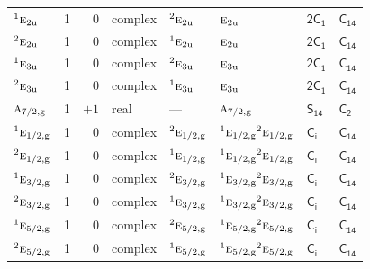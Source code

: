 \documentclass[10pt,a4paper]{article}
\makeatletter
\def\grouprule#1#2{\noalign{\marks\LTgroupmarks{\the\belowrulesep}\nobreak\vskip#1%
  \vskip\aboverulesep}\multispan\LT@cols\unskip{\leaders\hrule\@height#2\hfill\kern\z@}\cr
  \noalign{\penalty\LTrulebreak\vskip\belowrulesep\global\@lastruleclass\z@}}
\numberwithin{equation}{section}
\newcommand{\grp}[1]{\mathsf{#1}}
\newcommand{\irr}[1]{\text{\normalfont\scshape #1}}
\newcommand{\conjpair}[1]{{}^{#1}}
\newcommand{\ptag}[1]{\mathrm{#1}}
\makeatother
\begin{document}
{\begin{longtable}{@{}lrrlllll@{}}
$\conjpair{1}\irr{e}_{2\ptag{u}}$ & 1 & $0$ & complex & $\conjpair{2}\irr{e}_{2\ptag{u}}$ & $\irr{e}_{2\ptag{u}}$ & \href{2C1.pdf}{$\grp{2C_{1}}$} & $\grp{C_{14}}$\\
$\conjpair{2}\irr{e}_{2\ptag{u}}$ & 1 & $0$ & complex & $\conjpair{1}\irr{e}_{2\ptag{u}}$ & $\irr{e}_{2\ptag{u}}$ & \href{2C1.pdf}{$\grp{2C_{1}}$} & $\grp{C_{14}}$\\
$\conjpair{1}\irr{e}_{3\ptag{u}}$ & 1 & $0$ & complex & $\conjpair{2}\irr{e}_{3\ptag{u}}$ & $\irr{e}_{3\ptag{u}}$ & \href{2C1.pdf}{$\grp{2C_{1}}$} & $\grp{C_{14}}$\\
$\conjpair{2}\irr{e}_{3\ptag{u}}$ & 1 & $0$ & complex & $\conjpair{1}\irr{e}_{3\ptag{u}}$ & $\irr{e}_{3\ptag{u}}$ & \href{2C1.pdf}{$\grp{2C_{1}}$} & $\grp{C_{14}}$\\
\grouprule{0pt}{\lightrulewidth}
$\irr{a}_{7/2,\ptag{g}}$ & 1 & $+1$ & real & --- & $\irr{a}_{7/2,\ptag{g}}$ & \href{S14.pdf}{$\grp{S_{14}}$} & \href{../../../rotation/data/pdf/C2.pdf}{$\grp{C_{2}}$}\\
$\conjpair{1}\irr{e}_{1/2,\ptag{g}}$ & 1 & $0$ & complex & $\conjpair{2}\irr{e}_{1/2,\ptag{g}}$ & $\conjpair{1}\irr{e}_{1/2,\ptag{g}}\conjpair{2}\irr{e}_{1/2,\ptag{g}}$ & \href{S2.pdf}{$\grp{C_{i}}$} & $\grp{C_{14}}$\\
$\conjpair{2}\irr{e}_{1/2,\ptag{g}}$ & 1 & $0$ & complex & $\conjpair{1}\irr{e}_{1/2,\ptag{g}}$ & $\conjpair{1}\irr{e}_{1/2,\ptag{g}}\conjpair{2}\irr{e}_{1/2,\ptag{g}}$ & \href{S2.pdf}{$\grp{C_{i}}$} & $\grp{C_{14}}$\\
$\conjpair{1}\irr{e}_{3/2,\ptag{g}}$ & 1 & $0$ & complex & $\conjpair{2}\irr{e}_{3/2,\ptag{g}}$ & $\conjpair{1}\irr{e}_{3/2,\ptag{g}}\conjpair{2}\irr{e}_{3/2,\ptag{g}}$ & \href{S2.pdf}{$\grp{C_{i}}$} & $\grp{C_{14}}$\\
$\conjpair{2}\irr{e}_{3/2,\ptag{g}}$ & 1 & $0$ & complex & $\conjpair{1}\irr{e}_{3/2,\ptag{g}}$ & $\conjpair{1}\irr{e}_{3/2,\ptag{g}}\conjpair{2}\irr{e}_{3/2,\ptag{g}}$ & \href{S2.pdf}{$\grp{C_{i}}$} & $\grp{C_{14}}$\\
$\conjpair{1}\irr{e}_{5/2,\ptag{g}}$ & 1 & $0$ & complex & $\conjpair{2}\irr{e}_{5/2,\ptag{g}}$ & $\conjpair{1}\irr{e}_{5/2,\ptag{g}}\conjpair{2}\irr{e}_{5/2,\ptag{g}}$ & \href{S2.pdf}{$\grp{C_{i}}$} & $\grp{C_{14}}$\\
$\conjpair{2}\irr{e}_{5/2,\ptag{g}}$ & 1 & $0$ & complex & $\conjpair{1}\irr{e}_{5/2,\ptag{g}}$ & $\conjpair{1}\irr{e}_{5/2,\ptag{g}}\conjpair{2}\irr{e}_{5/2,\ptag{g}}$ & \href{S2.pdf}{$\grp{C_{i}}$} & $\grp{C_{14}}$\\

\end{longtable}}
\end{document}
